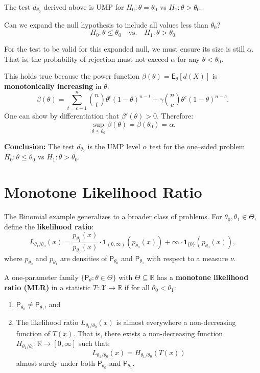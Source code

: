 \begin{ex}
The test $d_{\theta_0}$ derived above is UMP for $H_0: \theta = \theta_0$ vs $H_1: \theta > \theta_0$.

Can we expand the null hypothesis to include all values less than $\theta_0$?
\[ H_0: \theta \le \theta_0 \quad \text{vs.} \quad H_1: \theta > \theta_0 \]

For the test to be valid for this expanded null, we must ensure its size is still $\alpha$. That is, the probability of rejection must not exceed $\alpha$ for any $\theta < \theta_0$.

This holds true because the power function $\beta(\theta) = \mathsf{E}_{\theta}[d(X)]$ is \textbf{monotonically increasing} in $\theta$.
\[ \beta(\theta) = \sum_{t=c+1}^{n} \binom{n}{t} \theta^t (1-\theta)^{n-t} + \gamma \binom{n}{c} \theta^c (1-\theta)^{n-c}. \]
One can show by differentiation that $\beta'(\theta) > 0$. Therefore:
\[ \sup_{\theta \le \theta_0} \beta(\theta) = \beta(\theta_0) = \alpha. \]

\textbf{Conclusion:}
The test $d_{\theta_0}$ is the UMP level $\alpha$ test for the one--sided problem $H_0: \theta \le \theta_0$ vs $H_1: \theta > \theta_0$.
\end{ex}

\section{Monotone Likelihood Ratio}
\label{sec:monotone_likelihood_ratio}

The Binomial example generalizes to a broader class of problems.
For $\theta_0, \theta_1 \in \Theta$, define the \textbf{likelihood ratio}:
\[
L_{\theta_1/\theta_0}(x) = \frac{p_{\theta_1}(x)}{p_{\theta_0}(x)} \cdot \mathbf{1}_{(0,\infty)}(p_{\theta_0}(x)) + \infty \cdot \mathbf{1}_{\{0\}}(p_{\theta_0}(x)),
\]
where $p_{\theta_0}$ and $p_{\theta_1}$ are densities of $\mathsf{P}_{\theta_0}$ and $\mathsf{P}_{\theta_1}$ with respect to a measure $\nu$.

\begin{definition}
\label{def:mlr}
A one-parameter family $\{\mathsf{P}_{\theta}: \theta \in \Theta\}$ with $\Theta \subseteq \mathbb{R}$ has a \textbf{monotone likelihood ratio (MLR)} in a statistic $T: \mathcal{X} \to \mathbb{R}$ if for all $\theta_0 < \theta_1$:

\begin{enumerate}[label=\roman*)]
    \item $\mathsf{P}_{\theta_0} \neq \mathsf{P}_{\theta_1}$, and
    \item The likelihood ratio $L_{\theta_1/\theta_0}(x)$ is almost everywhere a non-decreasing function of $T(x)$. That is, there exists a non-decreasing function $H_{\theta_1/\theta_0}: \mathbb{R} \to [0, \infty]$ such that:
    \[ L_{\theta_1/\theta_0}(x) = H_{\theta_1/\theta_0}(T(x)) \]
    almost surely under both $\mathsf{P}_{\theta_0}$ and $\mathsf{P}_{\theta_1}$.
\end{enumerate}
\end{definition}



